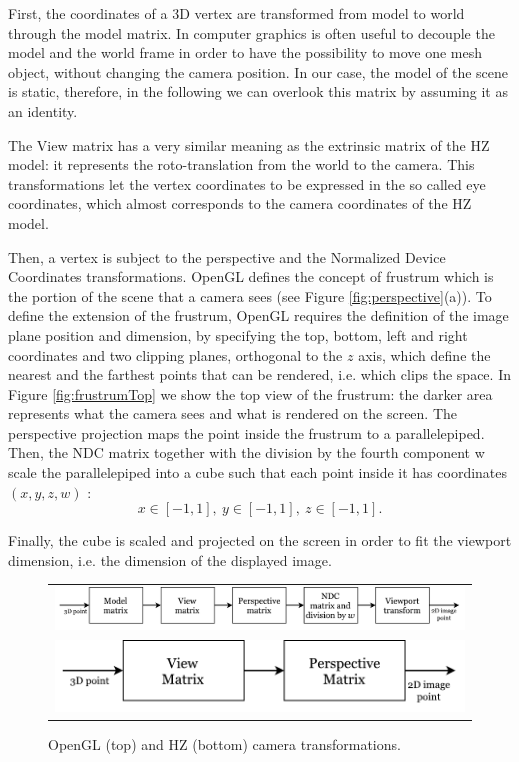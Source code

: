 First, the coordinates of a 3D vertex are transformed from model to world through the model matrix. 
In computer graphics is often useful to decouple the model and the world frame in order to have the possibility to move one mesh object, without changing the camera position. 
In our case, the model of the scene is static, therefore, in the following we can overlook this matrix by assuming it as an identity.

The View matrix has a very similar meaning as the extrinsic matrix of the HZ model: it represents the roto-translation from the world to the camera. This transformations let the vertex coordinates to be expressed in the so called eye coordinates, which almost corresponds to the camera coordinates of the HZ model.

Then, a vertex is subject to the perspective and the Normalized Device Coordinates transformations.
OpenGL defines the concept of frustrum which is the portion of the scene that a camera sees (see Figure \ref{fig:perspective}(a)).
To define the extension of the frustrum, OpenGL requires the definition of the image plane position and dimension, by specifying the top, bottom, left and right coordinates and two clipping planes, orthogonal to the $z$ axis, which define the nearest and the farthest points that can be rendered, i.e. which clips the space. 
In Figure \ref{fig:frustrumTop} we show the top view of the frustrum: the darker area represents what the camera sees and what is rendered on the screen. 
The perspective projection maps the point inside the frustrum to a parallelepiped. 
Then, the NDC matrix together with the division by the fourth component w scale the parallelepiped into a cube such that each point inside it has coordinates $(x,y,z,w)$ :
\begin{equation}
 x \in [-1,1], \:
 y \in [-1,1], \:
 z \in [-1,1] .
\end{equation}

Finally, the cube is scaled and projected on the screen in order to fit the viewport dimension, i.e. the dimension of the displayed image.

\begin{figure}[t]
 \begin{tabular}{c}
  \includegraphics[height=0.1\columnwidth]{./img/ch-camera/cameraopengl-hz01}\\
  \includegraphics[height=0.1\columnwidth]{./img/ch-camera/cameraopengl-hz02}
 \end{tabular}
 \caption{OpenGL (top) and HZ (bottom) camera transformations.}
 \label{fig:camtrans}
\end{figure}

